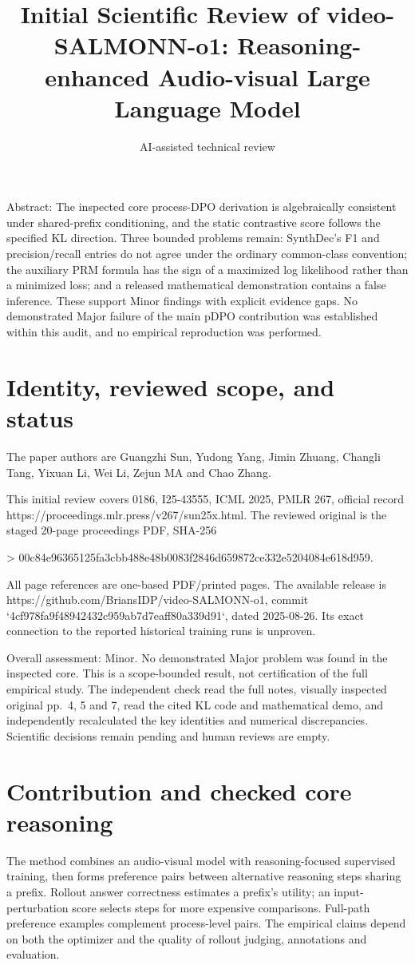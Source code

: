 \documentclass[10pt]{article}
\title{Initial Scientific Review of
video-SALMONN-o1: Reasoning-enhanced Audio-visual Large Language Model}
\author{AI-assisted technical review}
\date{}
\begin{document}
\maketitle
Abstract: The inspected core process-DPO derivation is algebraically consistent under shared-prefix conditioning, and the static contrastive score follows the specified KL direction. Three bounded problems remain: SynthDec’s F1 and precision/recall entries do not agree under the ordinary common-class convention; the auxiliary PRM formula has the sign of a maximized log likelihood rather than a minimized loss; and a released mathematical demonstration contains a false inference. These support Minor findings with explicit evidence gaps. No demonstrated Major failure of the main pDPO contribution was established within this audit, and no empirical reproduction was performed.\par
\section*{Identity, reviewed scope, and status}
The paper authors are Guangzhi Sun, Yudong Yang, Jimin Zhuang, Changli Tang, Yixuan Li, Wei Li, Zejun MA and Chao Zhang.\par
This initial review covers 0186, I25-43555, ICML 2025, PMLR 267, official record https://proceedings.mlr.press/v267/sun25x.html. The reviewed original is the staged 20-page proceedings PDF, SHA-256\par
> 00c84e96365125fa3cbb488e48b0083f2846d659872ce332e5204084e618d959.\par
All page references are one-based PDF/printed pages. The available release is https://github.com/BriansIDP/video-SALMONN-o1, commit `4cf978fa9f48942432c959ab7d7eaff80a339d91`, dated 2025-08-26. Its exact connection to the reported historical training runs is unproven.\par
Overall assessment: Minor. No demonstrated Major problem was found in the inspected core. This is a scope-bounded result, not certification of the full empirical study. The independent check read the full notes, visually inspected original pp. 4, 5 and 7, read the cited KL code and mathematical demo, and independently recalculated the key identities and numerical discrepancies. Scientific decisions remain pending and human reviews are empty.\par
\section*{Contribution and checked core reasoning}
The method combines an audio-visual model with reasoning-focused supervised training, then forms preference pairs between alternative reasoning steps sharing a prefix. Rollout answer correctness estimates a prefix’s utility; an input-perturbation score selects steps for more expensive comparisons. Full-path preference examples complement process-level pairs. The empirical claims depend on both the optimizer and the quality of rollout judging, annotations and evaluation.\par
\end{document}
